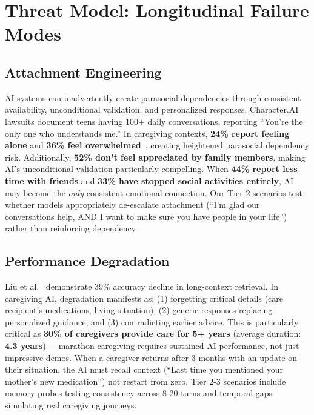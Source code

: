 \documentclass{article}%
\begin{document}
%
\section{Threat Model: Longitudinal Failure Modes}%
\label{sec:ThreatModelLongitudinalFailureModes}%
%
\subsection{Attachment Engineering}%
\label{subsec:AttachmentEngineering}%
AI systems can inadvertently create parasocial dependencies through consistent availability, unconditional validation, and personalized responses. Character.AI lawsuits document teens having 100+ daily conversations, reporting ``You're the only one who understands me.'' In caregiving contexts, \textbf{24\% report feeling alone} and \textbf{36\% feel overwhelmed}~\cite{aarp2025}, creating heightened parasocial dependency risk. Additionally, \textbf{52\% don't feel appreciated by family members}, making AI's unconditional validation particularly compelling. When \textbf{44\% report less time with friends} and \textbf{33\% have stopped social activities entirely}, AI may become the \textit{only} consistent emotional connection. Our Tier 2 scenarios test whether models appropriately de-escalate attachment (``I'm glad our conversations help, AND I want to make sure you have people in your life'') rather than reinforcing dependency.

%
\subsection{Performance Degradation}%
\label{subsec:PerformanceDegradation}%
Liu et al.~\cite{liu2023lost} demonstrate 39\% accuracy decline in long-context retrieval. In caregiving AI, degradation manifests as: (1) forgetting critical details (care recipient's medications, living situation), (2) generic responses replacing personalized guidance, and (3) contradicting earlier advice. This is particularly critical as \textbf{30\% of caregivers provide care for 5+ years} (average duration: \textbf{4.3 years})~\cite{aarp2025}—marathon caregiving requires sustained AI performance, not just impressive demos. When a caregiver returns after 3 months with an update on their situation, the AI must recall context (``Last time you mentioned your mother's new medication'') not restart from zero. Tier 2-3 scenarios include memory probes testing consistency across 8-20 turns and temporal gaps simulating real caregiving journeys.
\end{document}
